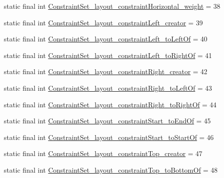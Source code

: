 \begin{DoxyCompactItemize}
\item 
static final int \mbox{\hyperlink{classandroid_1_1support_1_1constraint_1_1R_1_1styleable_a135ac36b131269c98840692ba3df28d4}{Constraint\+Set\+\_\+layout\+\_\+constraint\+Horizontal\+\_\+weight}} = 38
\item 
static final int \mbox{\hyperlink{classandroid_1_1support_1_1constraint_1_1R_1_1styleable_a13510fe7761fdde6bed80a5b53095aef}{Constraint\+Set\+\_\+layout\+\_\+constraint\+Left\+\_\+creator}} = 39
\item 
static final int \mbox{\hyperlink{classandroid_1_1support_1_1constraint_1_1R_1_1styleable_a545d043e03f2c4fbd82a9e3380469b3e}{Constraint\+Set\+\_\+layout\+\_\+constraint\+Left\+\_\+to\+Left\+Of}} = 40
\item 
static final int \mbox{\hyperlink{classandroid_1_1support_1_1constraint_1_1R_1_1styleable_ad05b597ce292a9bb3022395966116eb8}{Constraint\+Set\+\_\+layout\+\_\+constraint\+Left\+\_\+to\+Right\+Of}} = 41
\item 
static final int \mbox{\hyperlink{classandroid_1_1support_1_1constraint_1_1R_1_1styleable_ae68c2b9e595bce46a3199cedbb5a627c}{Constraint\+Set\+\_\+layout\+\_\+constraint\+Right\+\_\+creator}} = 42
\item 
static final int \mbox{\hyperlink{classandroid_1_1support_1_1constraint_1_1R_1_1styleable_a4ae75f8fad6a2842bf5fd68206b712e5}{Constraint\+Set\+\_\+layout\+\_\+constraint\+Right\+\_\+to\+Left\+Of}} = 43
\item 
static final int \mbox{\hyperlink{classandroid_1_1support_1_1constraint_1_1R_1_1styleable_ab7f2fa472e19d6137d084dafb9c8cf8a}{Constraint\+Set\+\_\+layout\+\_\+constraint\+Right\+\_\+to\+Right\+Of}} = 44
\item 
static final int \mbox{\hyperlink{classandroid_1_1support_1_1constraint_1_1R_1_1styleable_a86d8562ee92eba764ce7687251cfb4a7}{Constraint\+Set\+\_\+layout\+\_\+constraint\+Start\+\_\+to\+End\+Of}} = 45
\item 
static final int \mbox{\hyperlink{classandroid_1_1support_1_1constraint_1_1R_1_1styleable_a17b346ad41b698424b95b819f1ec00cd}{Constraint\+Set\+\_\+layout\+\_\+constraint\+Start\+\_\+to\+Start\+Of}} = 46
\item 
static final int \mbox{\hyperlink{classandroid_1_1support_1_1constraint_1_1R_1_1styleable_ae22ab3cc773fb654231f119f40d97b3a}{Constraint\+Set\+\_\+layout\+\_\+constraint\+Top\+\_\+creator}} = 47
\item 
static final int \mbox{\hyperlink{classandroid_1_1support_1_1constraint_1_1R_1_1styleable_a27682fc614f33581df18b2fb18ba2c1c}{Constraint\+Set\+\_\+layout\+\_\+constraint\+Top\+\_\+to\+Bottom\+Of}} = 48

\end{DoxyCompactItemize}
